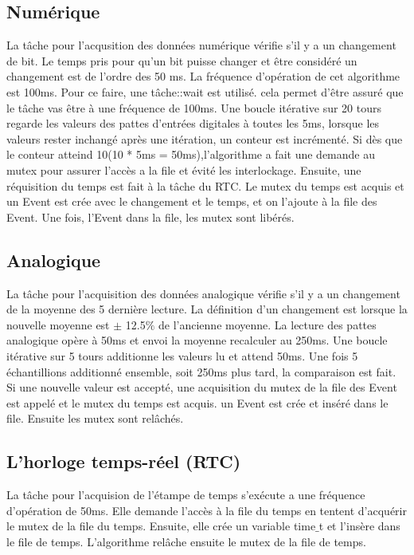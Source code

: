 \documentclass[12pt]{article}
\begin{document}
\subsection{Numérique}
La tâche pour l'acqusition des données numérique vérifie s'il y a un changement de bit. Le temps pris pour qu'un bit puisse changer et être considéré un changement est de l'ordre des 50 ms. La fréquence d'opération de cet algorithme est 100ms. Pour ce faire, une tâche::wait est utilisé. cela permet d'être assuré que le tâche vas être à une fréquence de 100ms. Une boucle itérative sur 20 tours regarde les valeurs des pattes d'entrées digitales à toutes les 5ms, lorsque les valeurs rester inchangé après une itération, un conteur est incrémenté. Si dès que le conteur atteind 10(10 * 5ms = 50ms),l'algorithme a fait une demande au mutex pour assurer l'accès a la file et évité les interlockage. Ensuite, une réquisition du temps est fait à la tâche du RTC. Le mutex du temps est acquis et un Event est crée avec le changement et le temps, et on l'ajoute à la file des Event. Une fois, l'Event dans la file, les mutex sont libérés.

\subsection{Analogique}
La tâche pour l'acquisition des données analogique vérifie s'il y a un changement de la moyenne des 5 dernière lecture. La définition d'un changement est lorsque la nouvelle moyenne est $\pm$ 12.5$\%$ de l'ancienne moyenne. La lecture des pattes analogique opère à 50ms et envoi la moyenne recalculer au 250ms. Une boucle itérative sur 5 tours additionne les valeurs lu et attend 50ms. Une fois 5 échantillions additionné ensemble, soit 250ms plus tard, la comparaison est fait. Si une nouvelle valeur est accepté, une acquisition du mutex de la file des Event est appelé et le mutex du temps est acquis. un Event est crée et inséré dans le file. Ensuite les mutex sont relâchés. 

\subsection{L'horloge temps-réel (RTC)}
La tâche pour l'acquision de l'étampe de temps s'exécute a une fréquence d'opération de 50ms. Elle demande l'accès à la file du temps en tentent d'acquérir le mutex de la file du temps. Ensuite, elle crée un variable time$\_$t et l'insère dans le file de temps. L'algorithme relâche ensuite le mutex de la file de temps.
\end{document}
